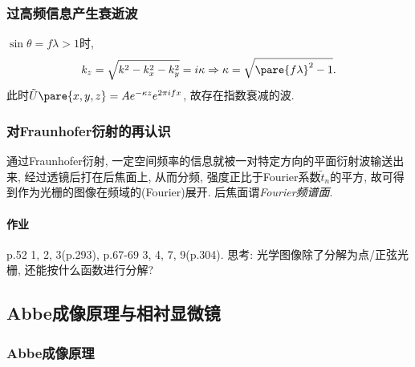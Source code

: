 \documentclass{ctexart}
\begin{document}

\subsubsection{过高频信息产生衰逝波} %
\label{ssub:过高频信息产生衰逝波}

$\sin \theta = f\lambda >1$时,
\[ k_z = \sqrt{k^2 - k_x^2 - k_y^2} = i\kappa\Rightarrow \kappa = \sqrt{\pare{f\lambda}^2 - 1}. \]
此时$\tilde{U}\pare{x,y,z} = Ae^{-\kappa z}e^{2\pi i fx}$, 故存在指数衰减的波.

\subsubsection{对Fraunhofer衍射的再认识} %
\label{ssub:对fraunhofer衍射的再认识}

通过Fraunhofer衍射, 一定空间频率的信息就被一对特定方向的平面衍射波输送出来, 经过透镜后打在后焦面上, 从而分频, 强度正比于Fourier系数$\tilde{t}_n$的平方, 故可得到作为光栅的图像在频域的(Fourier)展开. 后焦面谓\emph{Fourier频谱面}.


\paragraph{作业} %
\label{par:作业}

p.52 1, 2, 3(p.293), p.67-69 3, 4, 7, 9(p.304).
思考: 光学图像除了分解为点/正弦光栅, 还能按什么函数进行分解?




\subsection{Abbe成像原理与相衬显微镜} %
\label{sub:abbe成像原理与相衬显微镜}

\subsubsection{Abbe成像原理} %
\label{ssub:abbe成像原理}
\end{document}
